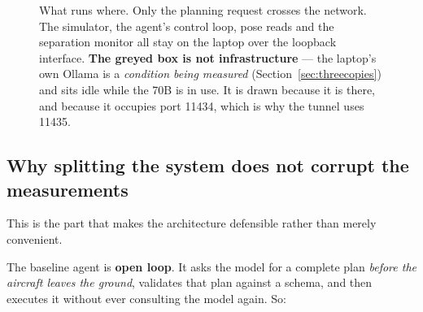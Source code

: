 \documentclass[11pt,a4paper]{article}
\begin{document}
\begin{figure}[h]
\caption{What runs where. Only the planning request crosses the network. The
simulator, the agent's control loop, pose reads and the separation monitor all
stay on the laptop over the loopback interface. \textbf{The greyed box is not
infrastructure} --- the laptop's own Ollama is a \emph{condition being measured}
(Section~\ref{sec:threecopies}) and sits idle while the 70B is in use. It is
drawn because it is there, and because it occupies port 11434, which is why the
tunnel uses 11435.}
\label{fig:arch}
\end{figure}

\subsection{Why splitting the system does not corrupt the measurements}

This is the part that makes the architecture defensible rather than merely
convenient.

The baseline agent is \textbf{open loop}. It asks the model for a complete plan
\emph{before the aircraft leaves the ground}, validates that plan against a
schema, and then executes it without ever consulting the model again. So:
\end{document}
